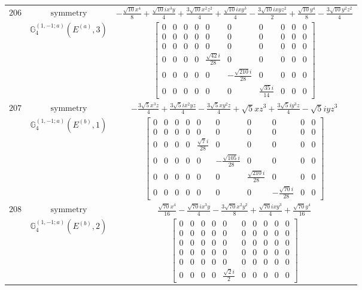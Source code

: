 \documentclass[fleqn,8pt,landscape]{jsarticle}
\begin{document}
\begin{longtable}{ccc}
$ 206 $ & $ \text{symmetry} $ & $ - \frac{\sqrt{10} x^{4}}{8} + \frac{\sqrt{10} i x^{3} y}{4} + \frac{3 \sqrt{10} x^{2} z^{2}}{4} + \frac{\sqrt{10} i x y^{3}}{4} - \frac{3 \sqrt{10} i x y z^{2}}{2} + \frac{\sqrt{10} y^{4}}{8} - \frac{3 \sqrt{10} y^{2} z^{2}}{4} $ \\
$  $ & $ \mathbb{G}_{4}^{(1,-1;a)}(E^{(a)},3) $ & $ \begin{bmatrix} 0 & 0 & 0 & 0 & 0 & 0 & 0 & 0 & 0 & 0 \\ 0 & 0 & 0 & 0 & 0 & 0 & 0 & 0 & 0 & 0 \\ 0 & 0 & 0 & 0 & 0 & 0 & 0 & 0 & 0 & 0 \\ 0 & 0 & 0 & 0 & \frac{\sqrt{42} i}{28} & 0 & 0 & 0 & 0 & 0 \\ 0 & 0 & 0 & 0 & 0 & - \frac{\sqrt{210} i}{28} & 0 & 0 & 0 & 0 \\ 0 & 0 & 0 & 0 & 0 & 0 & \frac{\sqrt{35} i}{14} & 0 & 0 & 0 \end{bmatrix} $ \\ \hline
$ 207 $ & $ \text{symmetry} $ & $ - \frac{3 \sqrt{5} x^{3} z}{4} + \frac{3 \sqrt{5} i x^{2} y z}{4} - \frac{3 \sqrt{5} x y^{2} z}{4} + \sqrt{5} x z^{3} + \frac{3 \sqrt{5} i y^{3} z}{4} - \sqrt{5} i y z^{3} $ \\
$  $ & $ \mathbb{G}_{4}^{(1,-1;a)}(E^{(b)},1) $ & $ \begin{bmatrix} 0 & 0 & 0 & 0 & 0 & 0 & 0 & 0 & 0 & 0 \\ 0 & 0 & 0 & 0 & 0 & 0 & 0 & 0 & 0 & 0 \\ 0 & 0 & 0 & 0 & \frac{\sqrt{7} i}{28} & 0 & 0 & 0 & 0 & 0 \\ 0 & 0 & 0 & 0 & 0 & - \frac{\sqrt{105} i}{28} & 0 & 0 & 0 & 0 \\ 0 & 0 & 0 & 0 & 0 & 0 & \frac{\sqrt{210} i}{28} & 0 & 0 & 0 \\ 0 & 0 & 0 & 0 & 0 & 0 & 0 & - \frac{\sqrt{70} i}{28} & 0 & 0 \end{bmatrix} $ \\ \hline
$ 208 $ & $ \text{symmetry} $ & $ \frac{\sqrt{70} x^{4}}{16} - \frac{\sqrt{70} i x^{3} y}{4} - \frac{3 \sqrt{70} x^{2} y^{2}}{8} + \frac{\sqrt{70} i x y^{3}}{4} + \frac{\sqrt{70} y^{4}}{16} $ \\
$  $ & $ \mathbb{G}_{4}^{(1,-1;a)}(E^{(b)},2) $ & $ \begin{bmatrix} 0 & 0 & 0 & 0 & 0 & 0 & 0 & 0 & 0 & 0 \\ 0 & 0 & 0 & 0 & 0 & 0 & 0 & 0 & 0 & 0 \\ 0 & 0 & 0 & 0 & 0 & 0 & 0 & 0 & 0 & 0 \\ 0 & 0 & 0 & 0 & 0 & 0 & 0 & 0 & 0 & 0 \\ 0 & 0 & 0 & 0 & 0 & 0 & 0 & 0 & 0 & 0 \\ 0 & 0 & 0 & 0 & \frac{\sqrt{2} i}{2} & 0 & 0 & 0 & 0 & 0 \end{bmatrix} $ \\ \hline

\end{longtable}
\end{document}
